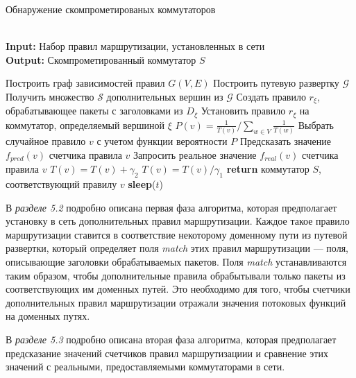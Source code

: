 \documentclass[14pt,autoref,href]{disser}
\theoremstyle{definition}
\begin{document}
\begin{algorithm}
\caption{Обнаружение скомпрометированых коммутаторов} \label{alg:detection}
\hspace*{\algorithmicindent} \\
\hspace*{\algorithmicindent} \textbf{Input:} Набор правил маршрутизации, установленных в сети \\
\hspace*{\algorithmicindent} \textbf{Output:} Скомпрометированный коммутатор $S$
\begin{algorithmic}[1]
\State Построить граф зависимостей правил $G(V,E)$
\State Построить путевую развертку $\mathcal{G}$
\State Получить множество $\mathscr{S}$ дополнительных вершин из $\mathcal{G}$
    \State Создать правило $r_{\xi}$, обрабатывающее пакеты с     заголовками из $D_{\xi}$
    \State Установить правило $r_{\xi}$ на коммутатор, определяемый вершиной $\xi$
\EndFor
{}
        \State $P(v) = \frac{1}{T(v)} / \sum_{w\in V}{\frac{1}{T(w)}}$
    \EndFor
    \State Выбрать случайное правило $v$ с учетом функции вероятности $P$
    \State Предсказать значение $f_{pred}(v)$ счетчика правила $v$
    \State Запросить реальное значение $f_{real}(v)$ счетчика правила $v$
        \State $T(v) = T(v) + \gamma_2$
    \Else
        \State $T(v) = T(v) / \gamma_1$
            \State \textbf{return} коммутатор $S$, соответствующий правилу $v$
        \EndIf
    \EndIf
    \State \textbf{sleep}($t$)
\EndWhile

\end{algorithmic}
\end{algorithm}

В \emph{разделе 5.2} подробно описана первая фаза алгоритма, которая предполагает установку в сеть дополнительных правил маршрутизации.
Каждое такое правило маршрутизации ставится в соответствие некоторому доменному пути из путевой развертки, который определяет поля \textit{match} этих правил маршрутизации --- поля, описывающие заголовки обрабатываемых пакетов.
Поля \textit{match} устанавливаются таким образом, чтобы дополнительные правила обрабытывали только пакеты из соответствующих им доменных путей.
Это необходимо для того, чтобы счетчики дополнительных правил маршрутизации отражали значения потоковых функций на доменных путях.

В \emph{разделе 5.3} подробно описана вторая фаза алгоритма, которая предполагает предсказание значений счетчиков правил маршрутизациии и сравнение этих значений с реальными, предоставляемыми коммутаторами в сети.
\end{document}

